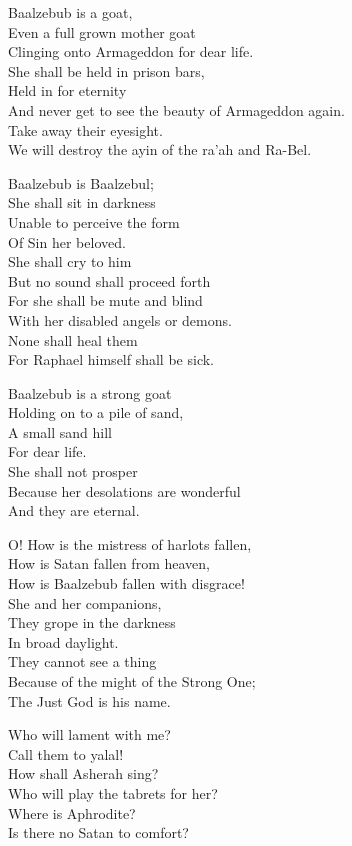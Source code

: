 \documentclass[
]{book}
\begin{document}
Baalzebub is a goat,\\
Even a full grown mother goat\\
Clinging onto Armageddon for dear life.\\
She shall be held in prison bars,\\
Held in for eternity\\
And never get to see the beauty of Armageddon again.\\
Take away their eyesight.\\
We will destroy the ayin of the ra'ah and Ra-Bel.

Baalzebub is Baalzebul;\\
She shall sit in darkness\\
Unable to perceive the form\\
Of Sin her beloved.\\
She shall cry to him\\
But no sound shall proceed forth\\
For she shall be mute and blind\\
With her disabled angels or demons.\\
None shall heal them\\
For Raphael himself shall be sick.

Baalzebub is a strong goat\\
Holding on to a pile of sand,\\
A small sand hill\\
For dear life.\\
She shall not prosper\\
Because her desolations are wonderful\\
And they are eternal.

O! How is the mistress of harlots fallen,\\
How is Satan fallen from heaven,\\
How is Baalzebub fallen with disgrace!\\
She and her companions,\\
They grope in the darkness\\
In broad daylight.\\
They cannot see a thing\\
Because of the might of the Strong One;\\
The Just God is his name.

Who will lament with me?\\
Call them to yalal!\\
How shall Asherah sing?\\
Who will play the tabrets for her?\\
Where is Aphrodite?\\
Is there no Satan to comfort?
\end{document}
